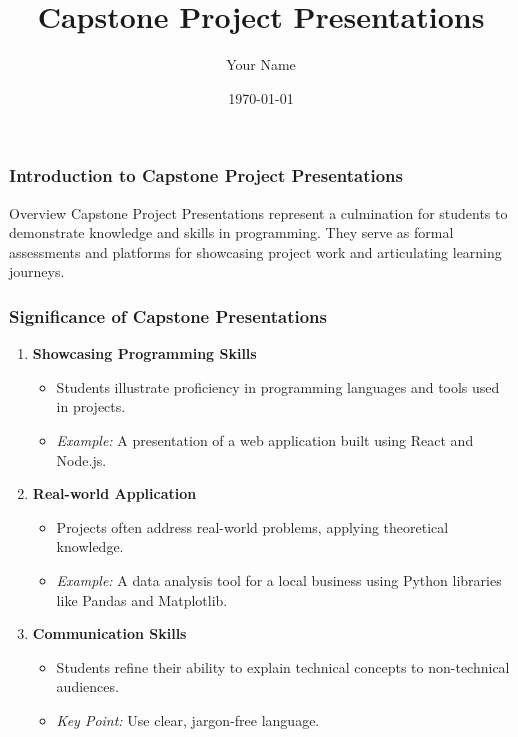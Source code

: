 \documentclass{beamer}
\title{Capstone Project Presentations}
\author{Your Name}
\institute{Your Institution}
\date{\today}
\begin{document}
\frame{\titlepage}

\begin{frame}[fragile]
    \frametitle{Introduction to Capstone Project Presentations}
    
    \begin{block}{Overview}
        Capstone Project Presentations represent a culmination for students to demonstrate knowledge and skills in programming. They serve as formal assessments and platforms for showcasing project work and articulating learning journeys.
    \end{block}
    
\end{frame}

\begin{frame}[fragile]
    \frametitle{Significance of Capstone Presentations}

    \begin{enumerate}
        \item \textbf{Showcasing Programming Skills}
            \begin{itemize}
                \item Students illustrate proficiency in programming languages and tools used in projects.
                \item \textit{Example:} A presentation of a web application built using React and Node.js.
            \end{itemize}
        
        \item \textbf{Real-world Application}
            \begin{itemize}
                \item Projects often address real-world problems, applying theoretical knowledge.
                \item \textit{Example:} A data analysis tool for a local business using Python libraries like Pandas and Matplotlib.
            \end{itemize}

        \item \textbf{Communication Skills}
            \begin{itemize}
                \item Students refine their ability to explain technical concepts to non-technical audiences.
                \item \textit{Key Point:} Use clear, jargon-free language.
            \end{itemize}
    \end{enumerate}
    
\end{frame}
\end{document}
